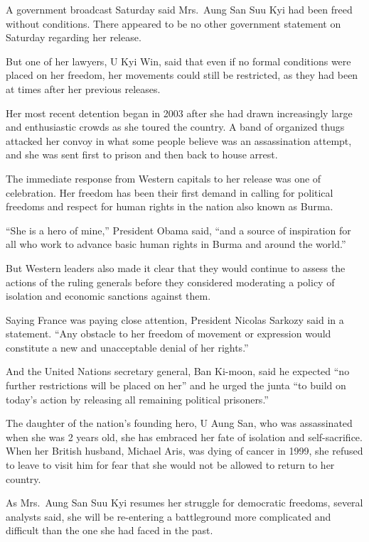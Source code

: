 ﻿\documentclass[12pt]{article}
\begin{document}
A government broadcast Saturday said Mrs.~Aung San Suu Kyi had been freed without conditions. There
appeared to be no other government statement on Saturday regarding her release.

But one of her lawyers, U Kyi Win, said that even if no formal conditions were placed on her
freedom, her movements could still be restricted, as they had been at times after her previous
releases.

Her most recent detention began in 2003 after she had drawn increasingly large and enthusiastic
crowds as she toured the country. A band of organized thugs attacked her convoy in what some people
believe was an assassination attempt, and she was sent first to prison and then back to house
arrest.

The immediate response from Western capitals to her release was one of celebration. Her freedom has
been their first demand in calling for political freedoms and respect for human rights in the nation
also known as Burma.

``She is a hero of mine,'' President Obama said, ``and a source of inspiration for all who work to
advance basic human rights in Burma and around the world.''

But Western leaders also made it clear that they would continue to assess the actions of the ruling
generals before they considered moderating a policy of isolation and economic sanctions against
them.

Saying France was paying close attention, President Nicolas Sarkozy said in a statement. ``Any
obstacle to her freedom of movement or expression would constitute a new and unacceptable denial of
her rights.''

And the United Nations secretary general, Ban Ki-moon, said he expected ``no further restrictions
will be placed on her'' and he urged the junta ``to build on today's action by releasing all
remaining political prisoners.''

The daughter of the nation's founding hero, U Aung San, who was assassinated when she was 2 years
old, she has embraced her fate of isolation and self-sacrifice. When her British husband, Michael
Aris, was dying of cancer in 1999, she refused to leave to visit him for fear that she would not be
allowed to return to her country.

As Mrs.~Aung San Suu Kyi resumes her struggle for democratic freedoms, several analysts said, she
will be re-entering a battleground more complicated and difficult than the one she had faced in the
past.
\end{document}
